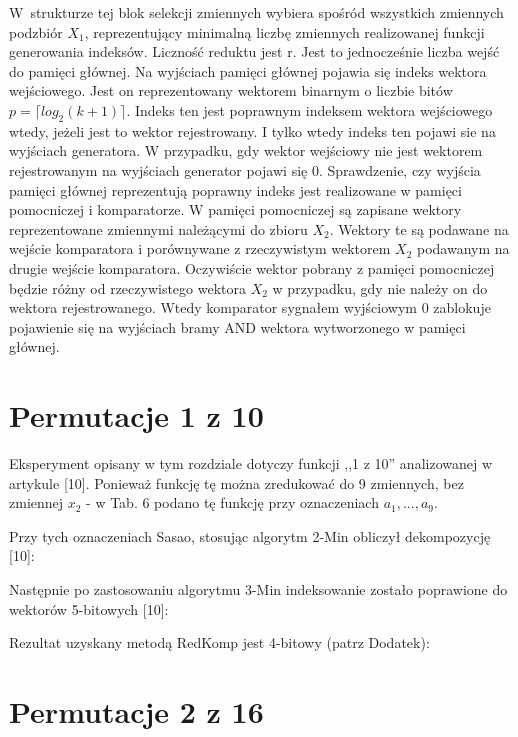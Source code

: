 W~strukturze tej blok selekcji zmiennych wybiera spośród wszystkich zmiennych podzbiór $X_1$,
reprezentujący minimalną liczbę zmiennych realizowanej funkcji generowania indeksów.
Liczność reduktu jest r.
Jest to jednocześnie liczba wejść do pamięci głównej.
Na wyjściach pamięci głównej pojawia się indeks wektora wejściowego. %
Jest on reprezentowany wektorem binarnym o liczbie bitów $p = \lceil log_2 (k+1)\rceil$.
Indeks ten jest poprawnym indeksem wektora wejściowego wtedy,
jeżeli jest to wektor rejestrowany.
I tylko wtedy indeks ten pojawi sie na wyjściach generatora.
W przypadku,
gdy wektor wejściowy nie jest wektorem rejestrowanym na wyjściach generator pojawi się 0.
Sprawdzenie,
czy wyjścia pamięci głównej reprezentują poprawny indeks jest realizowane w pamięci pomocniczej i komparatorze.
W pamięci pomocniczej są zapisane wektory reprezentowane zmiennymi należącymi do zbioru $X_2$.
Wektory te są podawane na wejście komparatora i porównywane z rzeczywistym wektorem $X_2$ podawanym na drugie wejście komparatora.
Oczywiście wektor pobrany z pamięci pomocniczej będzie różny od rzeczywistego wektora $X_2$ w przypadku,
gdy nie należy on do wektora rejestrowanego.
Wtedy komparator sygnałem wyjściowym 0 zablokuje pojawienie się na wyjściach bramy AND wektora wytworzonego w pamięci głównej.

\section{Permutacje 1 z 10}

Eksperyment opisany w tym rozdziale dotyczy funkcji ,,1 z 10'' analizowanej w artykule [10].
Ponieważ funkcję tę można zredukować do 9 zmiennych,
bez zmiennej $x_2$ - w Tab. 6 podano tę funkcję przy oznaczeniach $a_1, ..., a_9$.



Przy tych oznaczeniach Sasao, stosując algorytm 2-Min obliczył dekompozycję [10]:

Następnie po zastosowaniu algorytmu 3-Min indeksowanie zostało poprawione do wektorów 5-bitowych [10]:

Rezultat uzyskany metodą RedKomp jest 4-bitowy (patrz Dodatek):

\section{Permutacje 2 z 16}


